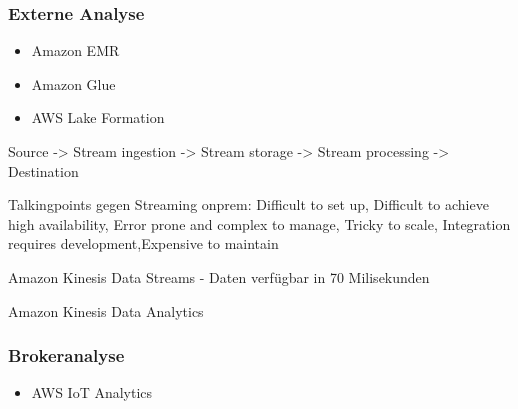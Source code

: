 \subsubsection{Externe Analyse}
\begin{itemize}
\item Amazon EMR
\item Amazon Glue
\item AWS Lake Formation
\end{itemize}




Source -> Stream ingestion -> Stream storage -> Stream processing -> Destination

Talkingpoints gegen Streaming onprem:
Difficult to set up, Difficult to achieve high availability,
Error prone and complex to manage,
Tricky to scale, Integration requires development,Expensive to maintain

Amazon Kinesis Data Streams - Daten verfügbar in 70 Milisekunden



Amazon Kinesis Data Analytics


\subsubsection{Brokeranalyse}

\begin{itemize}
\item AWS IoT Analytics
\end{itemize}